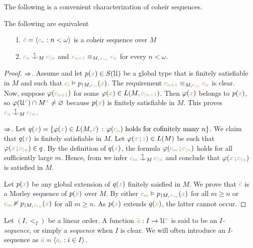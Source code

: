 The following is a convenient characterization of coheir sequences.

\begin{lemma}\label{lem_coheir_property}
The following are equivalent
\begin{itemize}
\item[1.] ${\color{brown}\bar c}=\langle{\color{brown}c_n}:n<\omega\rangle$ is a coheir sequence over $M$
\item[2.] ${\mr c_n}\cnonfork_M{\mr c_{\restriction n}}$ and ${\color{brown} c_{n+1}}\equiv_{M,\,{\color{brown} c_{\restriction n}}}{\color{brown} c_n}$ for every $n<\omega$.
\end{itemize}
\end{lemma}

\begin{proof}
$\Rightarrow$.
Assume  and let $p({\color{brown} x})\in S(\EuScript U)$ be a global type that is finitely satisfiable in $M$ and such that ${\color{brown} c_i}\vDash p_{\restriction M,{\color{brown} c_{\restriction i}}}({\color{brown} x})$.
The requirement ${\color{brown} c_{n+1}}\equiv_{M,{\color{brown} c_{\restriction n}}} {\color{brown} c_n}$ is clear.
Now, suppose $\varphi({\color{brown} c_{n+1}})$ for some $\varphi({\color{brown} x})\in L(M,{\color{brown} c_{\restriction n+1}})$.
Then $\varphi({\color{brown} x})$ belongs to $p({\color{brown} x})$, so $\varphi(\EuScript U^{\color{brown} x})\cap M^{\color{brown} x}\neq\varnothing$ because $p({\color{brown} x})$ is finitely satisfiable in $M$.
This proves ${\mr c_n}\cnonfork_M{\mr c_{\restriction n}}$.

$\Rightarrow$.
Let $q({\color{brown} x})=\{\varphi({\color{brown} x})\in L(M, {\color{brown}\bar c})\,:\, \varphi({\color{brown} c_n}) \textrm{ holds for cofinitely many } n\}$.
%
We claim that $q({\color{brown} x})$ is finitely satisfiable in $M$.
%
Let $\varphi({\color{brown} x}\,;{\color{brown} z})\in L(M)$ be such that $\varphi({\color{brown} x}\,;{\color{brown} c_{\restriction n}})\in q$.
%
By the definition of $q({\color{brown} x})$, the formula $\varphi({\color{brown} c_m}\,;{\color{brown} c_{\restriction n}})$ holds for all sufficiently large $m$.
%
Hence, from  we infer ${\mr c_m}\cnonfork_M{\mr c_{\restriction n}}$ and conclude that $\varphi({\color{brown} x}\,;{\color{brown} c_{\restriction n}})$ is satisfied in $M$.

Let $p({\color{brown} x})$ be any global extension of $q({\color{brown} x})$ finitely saisfied in $M$.
%
We prove that ${\color{brown}\bar c}$ is a Morley sequence of $p({\color{brown} x})$ over $M$.
%
By  either ${\color{brown} c_m}\vDash p_{\restriction  M,\,{\color{brown} c_{\restriction n}}}({\color{brown} x})$ for all $m\ge n$ or ${\color{brown} c_m}\nvDash p_{\restriction  M,\,{\color{brown} c_{\restriction n}}}({\color{brown} x})$ for all $m\ge n$.
%
As $p({\color{brown} x})$ extends $q({\color{brown} x})$, the latter cannot occur.
\end{proof}

Let $(I,<_I)$ be a linear order.
A function ${\color{brown}\bar a}:I\to\EuScript U^{\color{brown} x}$ is said to be an \emph{$I$-sequence}, or simply a \emph{sequence\/} when $I$ is clear.
We will often introduce an $I$-sequence as ${\color{brown}\bar a}=\langle{\color{brown}a_i}: i\in I\rangle$.

